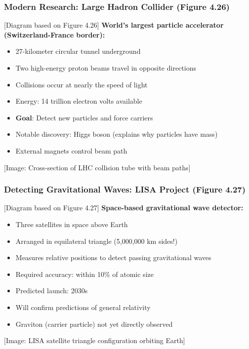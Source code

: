 \documentclass{beamer}
\begin{document}
\begin{frame}
\frametitle{Modern Research: Large Hadron Collider (Figure 4.26)}
\begin{alertblock}{[Diagram based on Figure 4.26]}
\textbf{World's largest particle accelerator (Switzerland-France border):}
\begin{itemize}
    \item 27-kilometer circular tunnel underground
    \item Two high-energy proton beams travel in opposite directions
    \item Collisions occur at nearly the speed of light
    \item Energy: 14 trillion electron volts available
    \item \textbf{Goal}: Detect new particles and force carriers
    \item Notable discovery: Higgs boson (explains why particles have mass)
    \item External magnets control beam path
\end{itemize}
\alert{[Image: Cross-section of LHC collision tube with beam paths]}
\end{alertblock}
\end{frame}

\begin{frame}
\frametitle{Detecting Gravitational Waves: LISA Project (Figure 4.27)}
\begin{alertblock}{[Diagram based on Figure 4.27]}
\textbf{Space-based gravitational wave detector:}
\begin{itemize}
    \item Three satellites in space above Earth
    \item Arranged in equilateral triangle (5,000,000 km sides!)
    \item Measures relative positions to detect passing gravitational waves
    \item Required accuracy: within 10\% of atomic size
    \item Predicted launch: 2030s
    \item Will confirm predictions of general relativity
    \item Graviton (carrier particle) not yet directly observed
\end{itemize}
\alert{[Image: LISA satellite triangle configuration orbiting Earth]}
\end{alertblock}
\end{frame}
\end{document}
